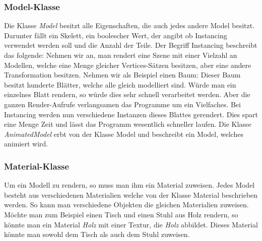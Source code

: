 \subsubsection{Model-Klasse}
\label{Modelclass}
Die Klasse \textit{Model} besitzt alle Eigenschaften, die auch jedes andere Model besitzt. Darunter fällt ein Skelett, ein boolescher Wert, der angibt ob Instancing verwendet werden soll und die Anzahl der Teile. 
Der Begriff Instancing beschreibt das folgende:
Nehmen wir an, man rendert eine Szene mit einer Vielzahl an Modellen, welche eine Menge gleicher Vertices-Sätzen besitzen, aber eine andere Transformation besitzen.
Nehmen wir als Beispiel einen Baum:
Dieser Baum besitzt hunderte Blätter, welche alle gleich modelliert sind. Würde man ein einzelnes Blatt rendern, so würde dies sehr schnell verarbeitet werden. Aber die ganzen Render-Aufrufe verlangsamen das Programme um ein Vielfaches. 
Bei Instancing werden nun verschiedene Instanzen dieses Blattes gerendert. Dies spart eine Menge Zeit und lässt das Programm wesentlich schneller laufen.
Die Klasse \textit{AnimatedModel} erbt von der Klasse Model und beschreibt ein Model, welches animiert wird.

\subsubsection{Material-Klasse}
Um ein Modell zu rendern, so muss man ihm ein Material zuweisen. Jedes Model besteht aus verschiedenen Materialien welche von der Klasse Material beschrieben werden.
So kann man verschiedene Objekten die gleichen Materialien zuweisen. Möchte man zum Beispiel einen Tisch und einen Stuhl aus Holz rendern, so könnte man ein Material \textit{Holz} mit einer Textur, die \textit{Holz} abbildet. Dieses Material könnte man sowohl dem Tisch als auch dem Stuhl zuweisen.




